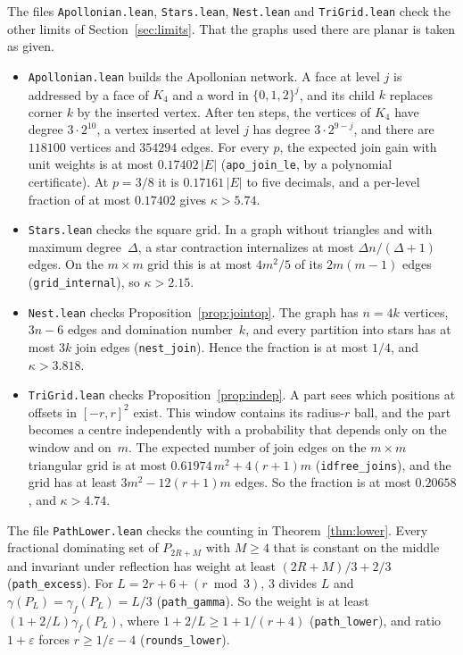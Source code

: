 \documentclass[11pt]{article}
\theoremstyle{remark}
\begin{document}
The files \texttt{Apollonian.lean}, \texttt{Stars.lean}, \texttt{Nest.lean} and \texttt{TriGrid.lean}
check the other limits of Section~\ref{sec:limits}. That the graphs used there are planar is taken
as given.
\begin{itemize}
\item \texttt{Apollonian.lean} builds the Apollonian network. A face at level $j$ is addressed by a
  face of $K_4$ and a word in $\{0,1,2\}^j$, and its child $k$ replaces corner $k$ by the inserted
  vertex. After ten steps, the vertices of $K_4$ have degree $3\cdot2^{10}$, a vertex inserted at
  level $j$ has degree $3\cdot2^{9-j}$, and there are $118100$ vertices and $354294$ edges. For every
  $p$, the expected join gain with unit weights is at most $0.17402\,|E|$ (\texttt{apo\_join\_le},
  by a polynomial certificate). At $p=3/8$ it is $0.17161\,|E|$ to five decimals, and a per-level
  fraction of at most $0.17402$ gives $\kappa>5.74$.
\item \texttt{Stars.lean} checks the square grid. In a graph without triangles and with maximum
  degree~$\Delta$, a star contraction internalizes at most $\Delta n/(\Delta+1)$ edges. On the
  $m\times m$ grid this is at most $4m^2/5$ of its $2m(m-1)$ edges (\texttt{grid\_internal}), so
  $\kappa>2.15$.
\item \texttt{Nest.lean} checks Proposition~\ref{prop:jointop}. The graph has $n=4k$ vertices,
  $3n-6$ edges and domination number~$k$, and every partition into stars has at most $3k$ join
  edges (\texttt{nest\_join}). Hence the fraction is at most $1/4$, and $\kappa>3.818$.
\item \texttt{TriGrid.lean} checks Proposition~\ref{prop:indep}. A part sees which positions at
  offsets in $[-r,r]^2$ exist. This window contains its radius-$r$ ball, and the part becomes a
  centre independently with a probability that depends only on the window and on~$m$. The expected
  number of join edges on the $m\times m$ triangular grid is at most $0.61974\,m^2+4(r+1)m$
  (\texttt{idfree\_joins}), and the grid has at least $3m^2-12(r+1)m$ edges. So the fraction is at
  most $0.20658$, and $\kappa>4.74$.
\end{itemize}

The file \texttt{PathLower.lean} checks the counting in Theorem~\ref{thm:lower}. Every fractional
dominating set of $P_{2R+M}$ with $M\ge4$ that is constant on the middle and invariant under
reflection has weight at least $(2R+M)/3+2/3$ (\texttt{path\_excess}). For $L=2r+6+(r\bmod3)$, $3$
divides $L$ and $\gamma(P_L)=\gamma_f(P_L)=L/3$ (\texttt{path\_gamma}). So the weight is at least
$(1+2/L)\gamma_f(P_L)$, where $1+2/L\ge1+1/(r+4)$ (\texttt{path\_lower}), and ratio $1+\varepsilon$
forces $r\ge1/\varepsilon-4$ (\texttt{rounds\_lower}).
\end{document}
